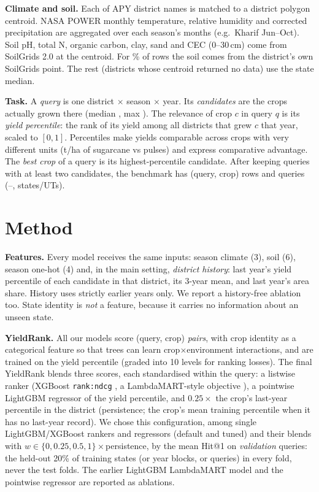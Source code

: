 \documentclass[conference]{IEEEtran}
\begin{document}
\textbf{Climate and soil.} Each of \NDistricts{} APY district names is matched to a district
polygon centroid. NASA POWER monthly temperature, relative humidity and corrected precipitation
\cite{nasapower,sparks2018} are aggregated over each season's months (e.g.\ Kharif Jun--Oct). Soil
pH, total N, organic carbon, clay, sand and CEC (0--30\,cm) come from SoilGrids 2.0
\cite{poggio2021} at the centroid. For \SoilOwnPct\% of rows the soil comes from the
district's own SoilGrids point. The rest (districts whose centroid returned no data) use the
state median.

\textbf{Task.} A \emph{query} is one district $\times$ season $\times$ year. Its
\emph{candidates} are the crops actually grown there (median \MedianCand, max \MaxCand). The relevance of crop $c$
in query $q$ is its \emph{yield percentile}: the rank of its yield among all districts that grew
$c$ that year, scaled to $[0,1]$. Percentiles make yields comparable across crops with very
different units (t/ha of sugarcane vs pulses) and express comparative advantage. The
\emph{best crop} of a query is its highest-percentile candidate. After keeping queries with at
least two candidates, the benchmark has \NRows{} (query, crop) rows and \NQueries{} queries
(\YearA--\YearB, \NStates{} states/UTs).

\section{Method}

\textbf{Features.} Every model receives the same inputs: season climate (3), soil (6), season
one-hot (4) and, in the main setting, \emph{district history}: last year's yield percentile of
each candidate in that district, its 3-year mean, and last year's area share. History uses
strictly earlier years only. We report a history-free ablation too. State identity is
\emph{not} a feature, because it carries no information about an unseen state.

\textbf{YieldRank.} All our models score (query, crop) \emph{pairs}, with crop identity as a
categorical feature so that trees can learn crop$\times$environment interactions, and are trained
on the yield percentile (graded into 10 levels for ranking losses). The final YieldRank blends
three scores, each standardised within the query: a listwise ranker (XGBoost \texttt{rank:ndcg}
\cite{chen2016}, a LambdaMART-style objective \cite{burges2010}), a pointwise LightGBM
\cite{ke2017} regressor of the yield percentile, and $0.25\times$ the crop's last-year percentile
in the district (persistence; the crop's mean training percentile when it has no last-year
record). We chose this configuration, among single LightGBM/XGBoost rankers and regressors (default
and tuned) and their blends with $w\in\{0,0.25,0.5,1\}\times$persistence, by the mean Hit@1 on
\emph{validation} queries: the held-out 20\% of training states (or year blocks, or queries) in
every fold, never the test folds. The earlier LightGBM LambdaMART model and the pointwise
regressor are reported as ablations.
\end{document}
